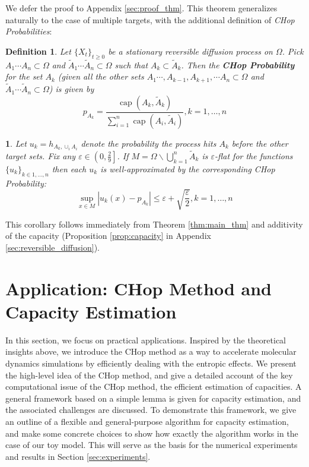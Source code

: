 \documentclass[english, aip, jcp, priprint, graphicx]{revtex4-1}
\newtheorem{definition}{Definition}
\theoremstyle{plain}
\theoremstyle{definition}
\theoremstyle{plain}
\newtheorem{cor}[thm]{\protect\corollaryname}
\providecommand{\corollaryname}{Corollary}
\begin{document}
We defer the proof to Appendix \ref{sec:proof_thm}. This theorem generalizes naturally to the case of multiple targets, with the additional definition of \textit{CHop Probabilities}:

\begin{definition}
Let $\{X_t\}_{t\geq 0}$ be a stationary reversible diffusion process on $\Omega$.  Pick $A_1\cdots A_n \subset \Omega$ and $\tilde A_1\cdots \tilde A_n \subset \Omega$ such that $A_k \subset \tilde A_k$.  Then the \textbf{CHop Probability} for the set $A_k$ (given all the other sets $A_1\cdots, A_{k-1}, A_{k+1}, \cdots A_n \subset \Omega$ and $\tilde A_1\cdots \tilde A_n \subset \Omega$) is given by
\begin{equation*}
p_{A_k} = \frac{\ensuremath{\operatorname{cap}} (A_k, \tilde{A}_k)}{\sum_{i = 1}^n \ensuremath{\operatorname{cap}} (A_i, \tilde{A}_i)}, k=1,\dots, n
\end{equation*} 
\end{definition}

\begin{cor}\label{thm:main_cor} Let $u_k = h_{A_k,\cup_i A_i}$ denote the probability the process hits $A_k$ before the other target sets.  Fix any $\varepsilon \in \left( 0, \frac{2}{9} \right]$.  If $M = \Omega \backslash \bigcup_{k = 1}^n \tilde{A}_k $ is $\varepsilon$-flat for the functions $\{u_k\}_{k\in1,\dots, n}$ then each $u_k$ is well-approximated by the corresponding CHop Probability:
\[ \sup_{x \in M} \left| u_k (x) - p_{A_k} \right| \leqslant \varepsilon + \sqrt{\frac{\varepsilon}{2}}, k=1,\dots, n\]
\end{cor}

This corollary follows immediately from Theorem \ref{thm:main_thm} and additivity of the capacity (Proposition \ref{prop:capacity} in Appendix \ref{sec:reversible_diffusion}). 

\section{Application: CHop Method and Capacity Estimation}\label{sec:algorithm}

In this section, we focus on practical applications. Inspired by the theoretical insights above, we introduce the CHop method as a way to accelerate molecular dynamics simulations by efficiently dealing with the entropic effects. We present the high-level idea of the CHop method, and give a detailed account of the key computational issue of the CHop method, the efficient estimation of capacities. A general framework based on a simple lemma is given for capacity estimation, and the associated challenges are discussed. To demonstrate this framework, we give an outline of a flexible and general-purpose algorithm for capacity estimation, and make some concrete choices to show how exactly the algorithm works in the case of our toy model. This will serve as the basis for the numerical experiments and results in Section \ref{sec:experiments}.
\end{document}
